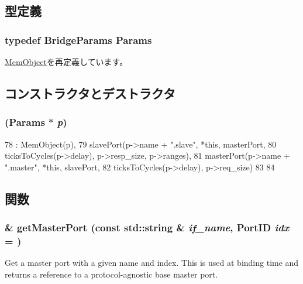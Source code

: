 \subsection{型定義}
\hypertarget{classBridge_aff1c1420f91a1e81dfd9dc93d1fd470f}{
\subsubsection[{Params}]{\setlength{\rightskip}{0pt plus 5cm}typedef BridgeParams {\bf Params}}}
\label{classBridge_aff1c1420f91a1e81dfd9dc93d1fd470f}


\hyperlink{classMemObject_a905bbc621eeec0ed08859e21c8c95412}{MemObject}を再定義しています。

\subsection{コンストラクタとデストラクタ}
\hypertarget{classBridge_a4fa35e032793298488841f07943d549f}{
\subsubsection[{Bridge}]{ ({\bf Params} $\ast$ {\em p})}}
\label{classBridge_a4fa35e032793298488841f07943d549f}



\begin{DoxyCode}
78     : MemObject(p),
79       slavePort(p->name + ".slave", *this, masterPort,
80                 ticksToCycles(p->delay), p->resp_size, p->ranges),
81       masterPort(p->name + ".master", *this, slavePort,
82                  ticksToCycles(p->delay), p->req_size)
83 {
84 }
\end{DoxyCode}


\subsection{関数}
\hypertarget{classBridge_adc4e675e51defbdd1e354dac729d0703}{
\subsubsection[{getMasterPort}]{ \& getMasterPort (const std::string \& {\em if\_\-name}, \/  {\bf PortID} {\em idx} = {})}}
\label{classBridge_adc4e675e51defbdd1e354dac729d0703}
Get a master port with a given name and index. This is used at binding time and returns a reference to a protocol-\/agnostic base master port.


